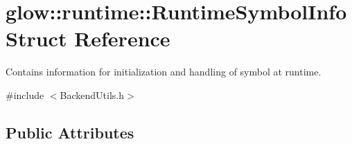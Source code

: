 \hypertarget{structglow_1_1runtime_1_1_runtime_symbol_info}{}\section{glow\+:\+:runtime\+:\+:Runtime\+Symbol\+Info Struct Reference}
\label{structglow_1_1runtime_1_1_runtime_symbol_info}


Contains information for initialization and handling of symbol at runtime.  




{\ttfamily \#include $<$Backend\+Utils.\+h$>$}

\subsection*{Public Attributes}
